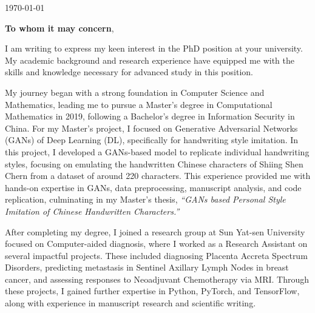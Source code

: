 \documentclass{ExpressiveCoverLetter}
\begin{document}

\hfill\today

\textbf{To whom it may concern}, 

{\fontsize{12}{15}\selectfont
I am writing to express my keen interest in the PhD position at your university. 
My academic background and research experience have equipped me with the skills and knowledge 
necessary for advanced study in this position.

My journey began with a strong foundation in Computer Science and Mathematics, 
leading me to pursue a Master's degree in Computational Mathematics in 2019, 
following a Bachelor's degree in Information Security in China. 
For my Master's project, I focused on Generative Adversarial Networks (GANs) of Deep Learning (DL), 
specifically for handwriting style imitation. 
In this project, I developed a GANs-based model to replicate individual handwriting styles, 
focusing on emulating the handwritten Chinese characters of Shiing Shen Chern from a dataset of around 220 characters. 
This experience provided me with hands-on expertise in GANs, 
data preprocessing, manuscript analysis, and code replication, 
culminating in my Master's thesis, \emph{``GANs based Personal Style Imitation of Chinese Handwritten Characters.''}


After completing my degree, 
I joined a research group at Sun Yat-sen University focused on Computer-aided diagnosis, 
where I worked as a Research Assistant on several impactful projects. 
These included diagnosing Placenta Accreta Spectrum Disorders, 
predicting metastasis in Sentinel Axillary Lymph Nodes in breast cancer, 
and assessing responses to Neoadjuvant Chemotherapy via MRI. 
Through these projects, I gained further expertise in Python, PyTorch, and TensorFlow, 
along with experience in manuscript research and scientific writing.

}
\end{document}
